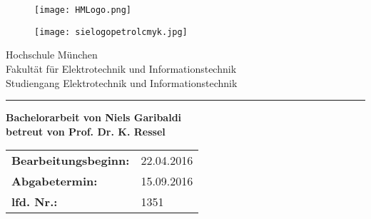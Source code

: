 \begin{titlepage}
	\begin{figure}[h]
		
		\begin{minipage}{0.45\linewidth} 
			\raggedright 
			\texttt{[image: HMLogo.png]} 
		\end{minipage} 
		\begin{minipage}{0.45\linewidth} 
			\raggedleft
			\vspace*{1 cm} 
			\texttt{[image: sielogopetrolcmyk.jpg]} 
		\end{minipage} 
	\end{figure}
	\begin{center} 
		\vspace{1.5 cm} {\LARGE Hochschule München} \\ 
		\vspace{1 cm} {\LARGE Fakultät für Elektrotechnik und Informationstechnik} \\ 
		\vspace{2 cm} {\Large Studiengang Elektrotechnik und Informationstechnik} \\ 
		\vspace*{2 cm}{\Huge \bf Industrie 4.0 - Pathfinding auf einer SPS\\} 
		\vspace{1 cm}
		\hrule
		\vspace*{1 cm}{\Huge \bf Industry 4.0 - Pathfinding on a PLC\\} 
		\vspace{2 cm}
		{\bf Bachelorarbeit von Niels Garibaldi}\\
		\vspace{1 cm}
		{\bf betreut von  Prof. Dr. K. Ressel}\\
		
	\end{center}
	\vspace{1 cm}
	\begin{center}
		
		\begin{tabular}{ll}
			
			{\bf Bearbeitungsbeginn:} & 22.04.2016\\
			{\bf Abgabetermin:} & 15.09.2016\\
			{\bf lfd. Nr.:} & 1351\\
		\end{tabular}
	\end{center}
	
\end{titlepage}
\pagestyle{headings}
\clearpage
{}
{}
